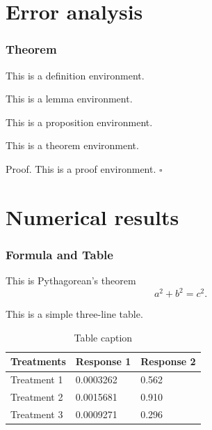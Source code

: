 \documentclass[noamsthm,notheorems,11pt,compress]{beamer}
\theoremstyle{plain} %
\newenvironment{proof}[1][Proof]{\par{\sffamily\color{structure.fg}#1.}%
\enspace\ignorespaces}{\par}
\newcommand{\QED}{\hfill\ensuremath{\square}}
\numberwithin{figure}{section}
\numberwithin{table}{section}
\numberwithin{equation}{section}
\begin{document}
\section{Error analysis}

\begin{frame}
\frametitle{Theorem}

\begin{definition}
This is a definition environment.
\end{definition}

\begin{lemma}
This is a lemma environment.
\end{lemma}

\begin{proposition}
This is a proposition environment.
\end{proposition}

\begin{theorem}
This is a theorem environment.
\end{theorem}

\begin{proof}
  This is a proof environment. \QED
\end{proof}

\end{frame}


\section{Numerical results}  %


\begin{frame}
\frametitle{Formula and Table}

This is Pythagorean's theorem
\begin{equation}\label{Pythagorean}
  a^2+b^2=c^2.
\end{equation}

This is a simple three-line table.
\begin{table}
\caption{Table caption}
\begin{tabular}{l l l}
\toprule
Treatments & Response 1 & Response 2 \\
\midrule
Treatment 1 & 0.0003262 & 0.562 \\
Treatment 2 & 0.0015681 & 0.910 \\
Treatment 3 & 0.0009271 & 0.296 \\
\bottomrule
\end{tabular}
\end{table}

\end{frame}
\end{document}
